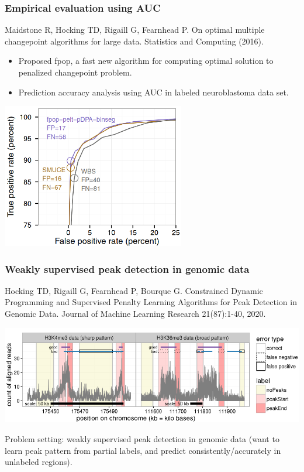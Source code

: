 \documentclass[t]{beamer}
\DeclareMathOperator*{\argmin}{arg\,min}
\begin{document}
\begin{frame}
  \frametitle{Empirical evaluation using AUC}

  {\scriptsize Maidstone R, Hocking TD, Rigaill G, Fearnhead P. On optimal multiple
  changepoint algorithms for large data. Statistics and Computing
  (2016).}

  \begin{itemize}
  \item Proposed fpop, a fast new algorithm for computing optimal solution to
    penalized changepoint problem.
\item Prediction accuracy analysis using AUC in labeled neuroblastoma
  data set.
  \end{itemize}

  \includegraphics[width=0.6\textwidth]{figure-Maidstone-roc}
\end{frame}

\begin{frame}
  \frametitle{Weakly supervised peak detection in genomic data}
{\scriptsize Hocking TD, Rigaill G, Fearnhead P, Bourque G. Constrained Dynamic Programming and Supervised Penalty Learning Algorithms for Peak Detection in Genomic Data. Journal of Machine Learning Research 21(87):1-40, 2020.}

  \includegraphics[width=\textwidth]{figure-Hocking2020-peak-label-errors}

  Problem setting: weakly supervised peak detection in genomic data
  (want to learn peak pattern from partial labels, and predict
  consistently/accurately in unlabeled regions).
\end{frame}
\end{document}
